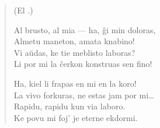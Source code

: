 \begin{verse}
\begin{center}
\footnotesize (El .)
\end{center}
               Al brusto, al mia --- ha, \^gi min doloras,\\
               Almetu maneton, amata knabino!\\
               Vi a\u udas, ke tie meblisto laboras?\\
               Li por mi la \^cerkon konstruas sen fino!

               Ha, kiel li frapas en mi en la koro!\\
               La vivo forkuras, ne estas jam por mi\dots\\
               Rapidu, rapidu kun via laboro.\\
               Ke povu mi foj' je eterne ekdormi.
               
\end{verse}


\smallrule{}